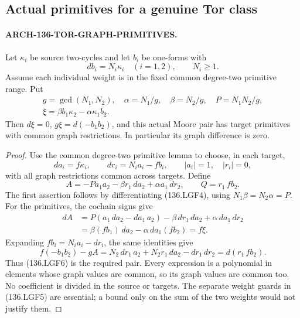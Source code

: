 \subsection{Actual primitives for a genuine Tor class}

\paragraph{ARCH-136-TOR-GRAPH-PRIMITIVES.}
Let \(\kappa_i\) be source two-cycles and let \(b_i\) be
one-forms with
\[
 db_i=N_i\kappa_i\quad(i=1,2),\qquad N_i\geq1.
\]
Assume each individual weight is in the fixed common degree-two
primitive range. Put
\[
 \begin{gathered}
 g=\gcd(N_1,N_2),\quad \alpha=N_1/g,\quad \beta=N_2/g,\quad P=N_1N_2/g,\\
 \xi=\beta b_1\kappa_2-\alpha\kappa_1b_2.
\end{gathered}
                                                        \tag{136.LGF4}
\]
Then \(d\xi=0\), \(g\xi=d(-b_1b_2)\), and this actual
Moore pair has target primitives with common graph restrictions.
In particular its graph difference is zero.

\begin{proof}
Use the common degree-two primitive lemma to choose, in each target,
\[
 da_i=f\kappa_i,\qquad dr_i=N_i a_i-fb_i,
                 \qquad |a_i|=1,\quad |r_i|=0,          \tag{136.LGF5}
\]
with all graph restrictions common across targets. Define
\[
 A=-P a_1a_2-\beta r_1\,da_2+\alpha a_1\,dr_2,
 \qquad Q=r_1\,fb_2.                                   \tag{136.LGF6}
\]
The first assertion follows by differentiating (136.LGF4), using
\(N_1\beta=N_2\alpha=P\). For the primitives, the cochain
signs give
\[
\begin{aligned}
 dA
 &=P(a_1\,da_2-da_1\,a_2)
            -\beta\,dr_1\,da_2+\alpha\,da_1\,dr_2\\
 &=\beta(fb_1)\,da_2-\alpha\,da_1(fb_2)=f\xi.
\end{aligned}                                         \tag{136.LGF7}
\]
Expanding \(fb_i=N_i a_i-dr_i\), the same identities give
\[
 f(-b_1b_2)-gA
    =N_2\,dr_1\,a_2+N_2r_1\,da_2-dr_1\,dr_2
    =d(r_1\,fb_2).                                    \tag{136.LGF8}
\]
Thus (136.LGF6) is the required pair. Every expression is a
polynomial in elements whose graph values are common, so its graph
values are common too. No coefficient is divided in the source or
targets. The separate weight guards in (136.LGF5) are essential;
a bound only on the sum of the two weights would not justify them.
\end{proof}

